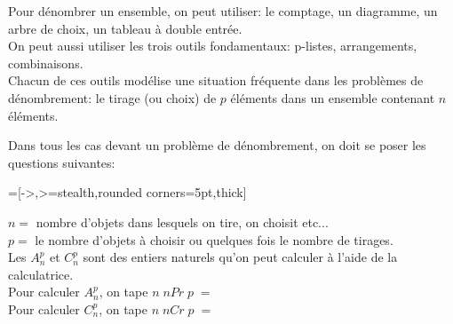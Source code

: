 




Pour dénombrer un ensemble, on peut utiliser: le comptage, un diagramme, un arbre de choix, un tableau à double entrée.\\
On peut aussi utiliser les trois outils fondamentaux:  p-listes,  arrangements,  combinaisons.\\ Chacun de ces outils  modélise  une situation fréquente  dans les problèmes de dénombrement: le tirage (ou choix) de $ p $ éléments dans un ensemble contenant  $ n $  éléments.

 Dans tous les cas devant un problème de dénombrement, on doit se poser les questions suivantes:
 
 \bigskip
 
 \begin{center}
=[->,>=stealth,rounded corners=5pt,thick]
\end{center}
 
  
  $ n= $ nombre d'objets dans lesquels on tire, on choisit etc...\\
  $ p= $  le nombre d'objets à choisir ou quelques fois le nombre de tirages.\\
  
Les $A_{n}^{p} $ et  $C_{n}^{p} $ sont des entiers naturels qu'on peut calculer à l'aide de la calculatrice.\\

 Pour calculer $A_{n}^{p} $, on tape $ n\; n Pr\; p\; =$\\

 Pour calculer $C_{n}^{p} $, on tape  $ n\; n Cr\; p\; =$
 
